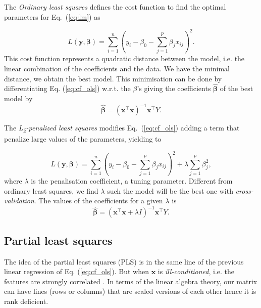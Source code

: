 \documentclass[conference]{IEEEtran}
\begin{document}
The \emph{Ordinary least squares} defines the cost function to find the optimal parameters for Eq.~(\ref{eq:lm}) as

\begin{equation}\label{eq:cf_ols}
  L(\mathbf{y}, \boldsymbol{\beta}) =\sum_{i=1}^{n}\left(y_{i}-\beta_{0}-\sum_{j=1}^{p} \beta_{j} x_{i j}\right)^{2}.
\end{equation}
%
This cost function represents a quadratic distance between the model, i.e. the linear combination of the coefficients and the data. We have the minimal distance, we obtain the best model. This minimisation can be done by differentiating Eq. (\ref{eq:cf_ols}) w.r.t. the $\beta$'s giving the coefficients $\hat{\boldsymbol{\beta}}$ of the best model by
%
\[
\hat{\boldsymbol{\beta}} = (\mathbf{x}^\top\mathbf{x})^{-1}\mathbf{x}^\top Y.
\]

The \emph{L\textsubscript{2}-penalized least squares} modifies Eq.~(\ref{eq:cf_ols}) adding a term that penalize large values of the parameters, yielding to

\begin{equation}
  L(\mathbf{y}, \boldsymbol{\beta}) = \sum_{i=1}^{n}\left(y_{i}-\beta_{0}-\sum_{j=1}^{p} \beta_{j} x_{i j}\right)^{2}+\lambda \sum_{j=1}^{p} \beta_{j}^{2},
\end{equation}
%
where $\lambda$ is the penalisation coefficient, a tuning parameter. Different from ordinary least squares, we find $\lambda$ such the model will be the best one with \emph{cross-validation}. The values of the coefficients for a given $\lambda$ is 
%
\[
\hat{\boldsymbol{\beta}} = (\mathbf{x}^\top\mathbf{x} + \lambda I)^{-1}\mathbf{x}^\top Y.
\]

\subsection{Partial least squares}

The idea of the partial least squares (PLS) is in the same line of the previous linear regression of Eq. (\ref{eq:cf_ols}). But when $\mathbf{x}$ is \emph{ill-conditioned}, i.e. the features are strongly correlated \cite{b7}. In terms of the linear algebra theory, our matrix can have lines (rows or columns) that are scaled versions of each other hence it is rank deficient.
\end{document}
